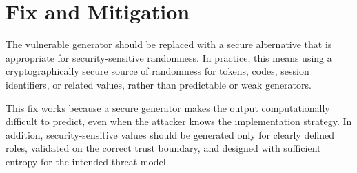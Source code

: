 \section{Fix and Mitigation}

The vulnerable generator should be replaced with a secure alternative that is
appropriate for security-sensitive randomness. In practice, this means using a
cryptographically secure source of randomness for tokens, codes, session
identifiers, or related values, rather than predictable or weak generators.

This fix works because a secure generator makes the output computationally
difficult to predict, even when the attacker knows the implementation strategy.
In addition, security-sensitive values should be generated only for clearly
defined roles, validated on the correct trust boundary, and designed with
sufficient entropy for the intended threat model.
